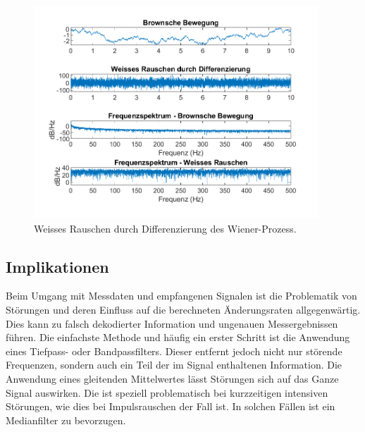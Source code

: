 
\begin{figure}
	\centering
	\includegraphics[width=0.95\textwidth]{papers/brown/images/weissesRauscheDurchBrown-timeDomain.png}
	\caption{Weisses Rauschen durch Differenzierung des Wiener-Prozess.}
	\label{brown:diffWienerFFT}
\end{figure}


\subsection{Implikationen\label{brown:Rauschen:Implikationen}}

Beim Umgang mit Messdaten und empfangenen Signalen ist die Problematik von Störungen und deren Einfluss auf die berechneten Änderungsraten allgegenwärtig. Dies  kann zu falsch dekodierter Information und ungenauen Messergebnissen führen. Die einfachste Methode und häufig ein erster Schritt ist die Anwendung eines Tiefpass- oder Bandpassfilters. Dieser entfernt jedoch nicht nur störende Frequenzen, sondern auch ein Teil der im Signal enthaltenen Information. Die Anwendung eines gleitenden Mittelwertes lässt Störungen sich auf das Ganze Signal auswirken. Die ist speziell problematisch bei kurzzeitigen intensiven Störungen, wie dies bei Impulsrauschen der Fall ist. In solchen Fällen ist ein Medianfilter zu bevorzugen.

